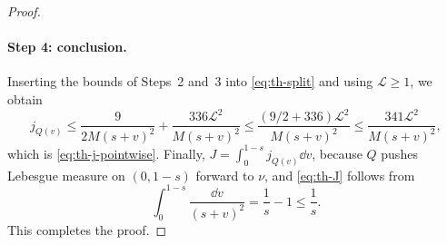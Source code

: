 \begin{proof}
\paragraph{Step 4: conclusion.}
Inserting the bounds of Steps~2 and~3 into \eqref{eq:th-split} and using
$\mathcal L\ge1$, we obtain
\[
 j_{Q(v)}\le\frac9{2M(s+v)^2}+\frac{336\mathcal L^2}{M(s+v)^2}
 \le\frac{(9/2+336)\mathcal L^2}{M(s+v)^2}
 \le\frac{341\mathcal L^2}{M(s+v)^2},
\]
which is \eqref{eq:th-j-pointwise}. Finally,
$J=\int_0^{1-s}j_{Q(v)}\dd v$, because $Q$ pushes Lebesgue measure on
$(0,1-s)$ forward to $\nu$, and \eqref{eq:th-J} follows from
\[
 \int_0^{1-s}\frac{\dd v}{(s+v)^2}=\frac1s-1\le\frac1s .
\]
This completes the proof.
\end{proof}
